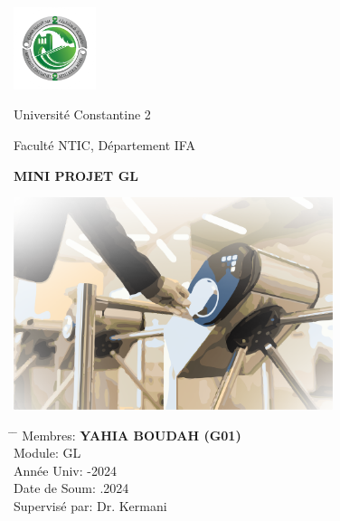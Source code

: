 
\begin{titlepage}
    \begin{center}
        \vspace*{0.6cm}
        
        \includegraphics[width=0.18\textwidth]{images/university_logo.png}
        \vspace{0.1cm}
        
        {\large Université Constantine 2} \par
        {\large Faculté NTIC, Département IFA } \par
        
        \vspace{1cm}

        \Huge
        \textbf{MINI PROJET GL}
        
        \vspace{2cm}
        
        \Huge
        \includegraphics[width=0.7\textwidth]{images/tourniquett.png}
        
        \vspace{4.2cm}	
        
    \end{center}

    \Large
    \begin{tabbing}
        \hspace*{1em}\= \hspace*{8em} \= \kill %
        \> Membres:\>  \textbf{YAHIA BOUDAH (G01)} \\
        \> Module:\>  GL  \\
        \> Année Univ: -2024 \\
        \> Date de Soum: .2024 \\
        \> Supervisé par: \> Dr. Kermani
    \end{tabbing}
    
\end{titlepage}
